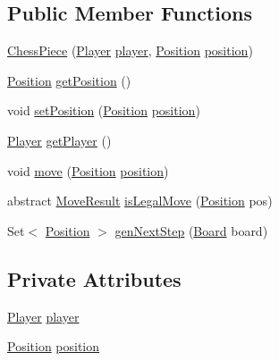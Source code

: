 \subsection*{Public Member Functions}
\begin{DoxyCompactItemize}
\item 
\mbox{\hyperlink{classchess_1_1models_1_1_chess_piece_a59beae5e1f384747a201a4c417ca0afb}{Chess\+Piece}} (\mbox{\hyperlink{enumchess_1_1models_1_1enums_1_1_player}{Player}} \mbox{\hyperlink{classchess_1_1models_1_1_chess_piece_a3bcc8a24667318b5aab8c146adcc3eb7}{player}}, \mbox{\hyperlink{classchess_1_1models_1_1_position}{Position}} \mbox{\hyperlink{classchess_1_1models_1_1_chess_piece_a0e4f8616b75e548f269d3971846396f3}{position}})
\item 
\mbox{\hyperlink{classchess_1_1models_1_1_position}{Position}} \mbox{\hyperlink{classchess_1_1models_1_1_chess_piece_a4ce783eeb2ec6d5cd83af05c11fe8cdb}{get\+Position}} ()
\item 
void \mbox{\hyperlink{classchess_1_1models_1_1_chess_piece_a2e3c62bde5041ca0aa53e0476cc8b600}{set\+Position}} (\mbox{\hyperlink{classchess_1_1models_1_1_position}{Position}} \mbox{\hyperlink{classchess_1_1models_1_1_chess_piece_a0e4f8616b75e548f269d3971846396f3}{position}})
\item 
\mbox{\hyperlink{enumchess_1_1models_1_1enums_1_1_player}{Player}} \mbox{\hyperlink{classchess_1_1models_1_1_chess_piece_aaa3cef5d52e4a228dc01f91133a6c437}{get\+Player}} ()
\item 
void \mbox{\hyperlink{classchess_1_1models_1_1_chess_piece_a77865fbd52257338c4e376af525155c7}{move}} (\mbox{\hyperlink{classchess_1_1models_1_1_position}{Position}} \mbox{\hyperlink{classchess_1_1models_1_1_chess_piece_a0e4f8616b75e548f269d3971846396f3}{position}})
\item 
abstract \mbox{\hyperlink{enumchess_1_1models_1_1enums_1_1_move_result}{Move\+Result}} \mbox{\hyperlink{classchess_1_1models_1_1_chess_piece_a60088166dd440bf51de4514c3e57841e}{is\+Legal\+Move}} (\mbox{\hyperlink{classchess_1_1models_1_1_position}{Position}} pos)
\item 
Set$<$ \mbox{\hyperlink{classchess_1_1models_1_1_position}{Position}} $>$ \mbox{\hyperlink{classchess_1_1models_1_1_chess_piece_afd359313e83bdef860f9f8236435522f}{gen\+Next\+Step}} (\mbox{\hyperlink{classchess_1_1models_1_1_board}{Board}} board)
\end{DoxyCompactItemize}
\subsection*{Private Attributes}
\begin{DoxyCompactItemize}
\item 
\mbox{\hyperlink{enumchess_1_1models_1_1enums_1_1_player}{Player}} \mbox{\hyperlink{classchess_1_1models_1_1_chess_piece_a3bcc8a24667318b5aab8c146adcc3eb7}{player}}
\item 
\mbox{\hyperlink{classchess_1_1models_1_1_position}{Position}} \mbox{\hyperlink{classchess_1_1models_1_1_chess_piece_a0e4f8616b75e548f269d3971846396f3}{position}}
\end{DoxyCompactItemize}



